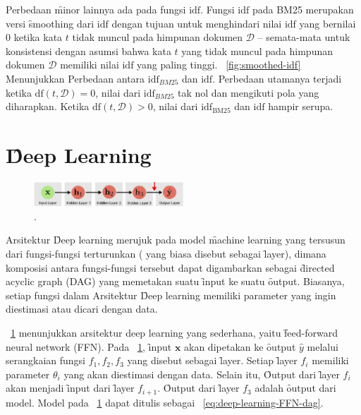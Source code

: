     
    Perbedaan \f{minor} lainnya ada pada fungsi $\text{idf}$. Fungsi $\text{idf}$ pada BM25 merupakan versi \f{smoothing} dari $\text{idf}$ dengan tujuan untuk menghindari nilai $\text{idf}$ yang bernilai 0 ketika kata $t$ tidak muncul pada himpunan dokumen $\mathcal{D}$ -- semata-mata untuk konsistensi dengan asumsi bahwa kata $t$ yang tidak muncul pada himpunan dokumen $\mathcal{D}$ memiliki nilai $\text{idf}$ yang paling tinggi. \pic~\ref{fig:smoothed-idf} Menunjukkan Perbedaan antara $\text{idf}_{BM25}$ dan $\text{idf}$. Perbedaan utamanya terjadi ketika $\text{df}(t,\mathcal{D}) = 0$, nilai dari  $\text{idf}_{BM25}$ tak nol dan mengikuti pola yang diharapkan. Ketika $\text{df}(t,\mathcal{D})>0$, nilai dari $\text{idf}_{\text{BM25}}$ dan $\text{idf}$ hampir serupa.

\section{\f{Deep Learning}}

    \begin{figure}
        \centering
        \includegraphics[width=0.50\textwidth]{assets/pics/dag-dl.png}
        \caption{\license.}
        \label{fig:deep-learning-FFN-dag}
    \end{figure}

    Arsitektur \f{Deep learning} merujuk pada model \f{machine learning} yang tersusun dari fungsi-fungsi terturunkan ( yang biasa disebut sebagai \f{layer}), dimana komposisi antara fungsi-fungsi tersebut dapat digambarkan sebagai \f{directed acyclic graph} (DAG) yang memetakan suatu \f{input} ke suatu \f{output}. Biasanya, setiap fungsi dalam Arsitektur \f{Deep learning} memiliki parameter yang ingin diestimasi atau dicari dengan data.
    
    \pic~\ref{fig:deep-learning-FFN-dag} menunjukkan arsitektur deep learning yang sederhana, yaitu \f{feed-forward neural network} (FFN). Pada \pic~\ref{fig:deep-learning-FFN-dag}, \f{input} $\mathbf{x}$ akan dipetakan ke \f{output} $\hat y$ melalui serangkaian fungsi $f_1, f_2, f_3$ yang disebut sebagai \f{layer}. Setiap \f{layer} $f_i$ memiliki parameter $\theta_i$ yang akan diestimasi dengan data. Selain itu, \f{Output} dari \f{layer} $f_i$ akan menjadi \f{input} dari \f{layer} $f_{i+1}$. \f{Output} dari \f{layer} $f_3$ adalah \f{output} dari model. Model pada \pic~\ref{fig:deep-learning-FFN-dag} dapat ditulis sebagai \equ~\ref{eq:deep-learning-FFN-dag}.

